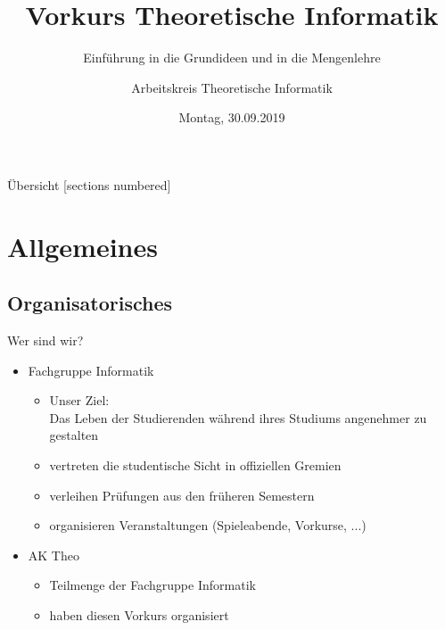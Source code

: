 \documentclass[10pt]{beamer}
\title{Vorkurs Theoretische Informatik}
\subtitle{Einführung in die Grundideen und in die Mengenlehre}
\date{Montag, 30.09.2019}
\author{Arbeitskreis Theoretische Informatik}
\institute{Fachgruppe Informatik}
\begin{document}
\maketitle

\begin{frame}[fragile]{Übersicht}
  [sections numbered]
  \tableofcontents%
\end{frame}

\section{Allgemeines} 

\subsection{Organisatorisches}
\begin{frame}[fragile]{Wer sind wir?}
    \begin{itemize}
        \item 
            Fachgruppe Informatik
            \begin{itemize}
                \item Unser Ziel: \\
                Das Leben der Studierenden während ihres Studiums angenehmer zu gestalten
                \item vertreten die studentische Sicht in offiziellen Gremien
                \item verleihen Prüfungen aus den früheren Semestern
                \item organisieren Veranstaltungen (Spieleabende, Vorkurse, ...)
            \end{itemize}
        \item AK Theo
        \begin{itemize}
            \item Teilmenge der Fachgruppe Informatik
            \item haben diesen Vorkurs organisiert
        \end{itemize}
    \end{itemize}
\end{frame}
\end{document}

